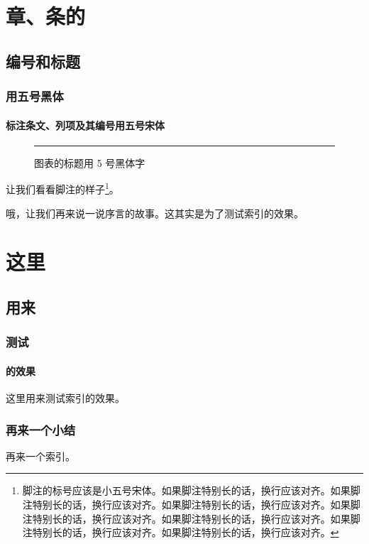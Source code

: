 \chapter{章、条的}
\section{编号和标题}
\subsection{用五号黑体}
\subsubsection{标注条文、列项及其编号用五号宋体}
\begin{figure}[htb]
\centering
\rule{4cm}{3cm}
\caption{图表的标题用 5 号黑体字}\label{fig:dummyfigure}
\end{figure}

让我们看看脚注的样子\footnote{脚注的标号应该是小五号宋体。如果脚注特别长的话，换行应该对齐。如果脚注特别长的话，换行应该对齐。如果脚注特别长的话，换行应该对齐。如果脚注特别长的话，换行应该对齐。如果脚注特别长的话，换行应该对齐。如果脚注特别长的话，换行应该对齐。如果脚注特别长的话，换行应该对齐。}。

哦，让我们再来说一说序言的故事。这其实是为了测试索引的效果。

\chapter{这里}
\section{用来}
\subsection{测试}
\subsubsection{的效果}
这里用来测试索引的效果。
\subsection{再来一个小结}
再来一个索引。
